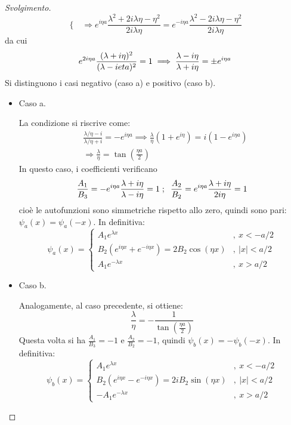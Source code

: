 \documentclass[11pt, a4paper]{scrartcl} %
\numberwithin{equation}{subsection}
\theoremstyle{style2}
\theoremstyle{style1}
\renewcommand\qedsymbol{$\blacksquare$}
\newenvironment{svolgimento}{\renewcommand\qedsymbol{$\spadesuit$}\begin{proof}[Svolgimento]}{\end{proof}}
\begin{document}
\begin{svolgimento}
\[\begin{cases}
\end{cases} \Rightarrow e^{i\eta a} \frac{\lambda ^2 + 2i\lambda \eta - \eta^2}{2 i \lambda \eta} = e^{-i\eta a} \frac{\lambda ^2 - 2i\lambda \eta - \eta^2}{2i\lambda \eta}
\] 
da cui
\begin{equation}
	e^{2i \eta a} \frac{(\lambda +i\eta)^2}{(\lambda -i\\eta)^2} = 1 \implies \frac{\lambda - i\eta}{\lambda  + i\eta} = \pm e^{i \eta a} 
\end{equation}
Si distinguono i casi negativo (caso a) e positivo (caso b).
\begin{itemize}
	\item Caso a.

	La condizione si riscrive come:
	\begin{equation}\label{sca}
	\begin{split}
		&\frac{\lambda  / \eta - i}{\lambda  / \eta + i} = - e^{i\eta a}  \implies \frac{\lambda}{\eta} (1+e^{i\eta} ) = i (1- e^{i\eta a} ) \\
		& \Rightarrow \frac{\lambda}{\eta} = \tan \left(\frac{\eta a}{2}\right) 
	\end{split}
	\end{equation}
	In questo caso, i coefficienti verificano
	\[
		\frac{A_1}{B_3}= -e^{i\eta a} \frac{\lambda  + i \eta}{\lambda  - i \eta} = 1 \hspace{.1cm} ; \hspace{.2cm} \frac{A_2}{B_2}= e^{i\eta a} \frac{\lambda +i\eta }{2i\eta }= 1
	\] 
cio\`e le autofunzioni sono simmetriche rispetto allo zero, quindi sono pari: $\psi_a (x) = \psi_a (-x)$. In definitiva:
\begin{equation}\label{spp}
	\psi _a(x) = \begin{cases}
		A_1 e^{\lambda x} &,\  x < - a/2\\
		B_2 (e^{i\eta x} + e^{-i\eta x} ) = 2B_2 \cos(\eta x) & ,\ \lvert x \rvert < a / 2\\
		A_1 e^{-\lambda x} &,\ x > a / 2
	\end{cases}
\end{equation}
\item Caso b.

	Analogamente, al caso precedente, si ottiene:
	\begin{equation}\label{scb}
	\frac{\lambda }{\eta} = -\frac{1}{\tan\left(\frac{\eta a}{2}\right) }
	\end{equation}
	Questa volta si ha $\frac{A_1}{B_3} = - 1$ e $\frac{A_2}{B_2} = -1$, quindi $\psi _b(x) = - \psi _b(-x)$. In definitiva:
	\begin{equation}\label{spn}
	\psi _b(x) = \begin{cases}
		A_1 e^{\lambda x} &,\  x < - a/2\\
		B_2 (e^{i\eta x} - e^{-i\eta x} ) = 2iB_2 \sin(\eta x) & ,\ \lvert x \rvert < a / 2\\
		-A_1 e^{-\lambda x} &,\ x > a / 2
	\end{cases}
\end{equation}
\end{itemize}
\end{svolgimento}
\end{document}
